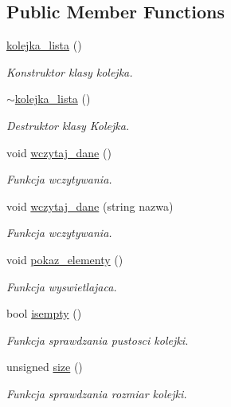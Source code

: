 \subsection*{Public Member Functions}
\begin{DoxyCompactItemize}
\item 
\hyperlink{classkolejka__lista_a501a2eeb46cc914d6aa84e0eab0f7b20}{kolejka\-\_\-lista} ()
\begin{DoxyCompactList}\small\item\em Konstruktor klasy kolejka. \end{DoxyCompactList}\item 
\hyperlink{classkolejka__lista_a01a293936690fd9af18220939a8a934c}{$\sim$kolejka\-\_\-lista} ()
\begin{DoxyCompactList}\small\item\em Destruktor klasy Kolejka. \end{DoxyCompactList}\item 
void \hyperlink{classkolejka__lista_a6b3e5198fc3f572417e718c5c263c184}{wczytaj\-\_\-dane} ()
\begin{DoxyCompactList}\small\item\em Funkcja wczytywania. \end{DoxyCompactList}\item 
void \hyperlink{classkolejka__lista_a0db9fa402ebbd0a4038950d3abddba8c}{wczytaj\-\_\-dane} (string nazwa)
\begin{DoxyCompactList}\small\item\em Funkcja wczytywania. \end{DoxyCompactList}\item 
void \hyperlink{classkolejka__lista_a42a5b9ed3da1c9d3b855999b890ccee3}{pokaz\-\_\-elementy} ()
\begin{DoxyCompactList}\small\item\em Funkcja wyswietlajaca. \end{DoxyCompactList}\item 
bool \hyperlink{classkolejka__lista_a139de3d0627c47ed921d95bd3bc41bae}{isempty} ()
\begin{DoxyCompactList}\small\item\em Funkcja sprawdzania pustosci kolejki. \end{DoxyCompactList}\item 
unsigned \hyperlink{classkolejka__lista_a874481fb9b5c8324205b30c28a58d713}{size} ()
\begin{DoxyCompactList}\small\item\em Funkcja sprawdzania rozmiar kolejki. \end{DoxyCompactList}\item 

\end{DoxyCompactItemize}
